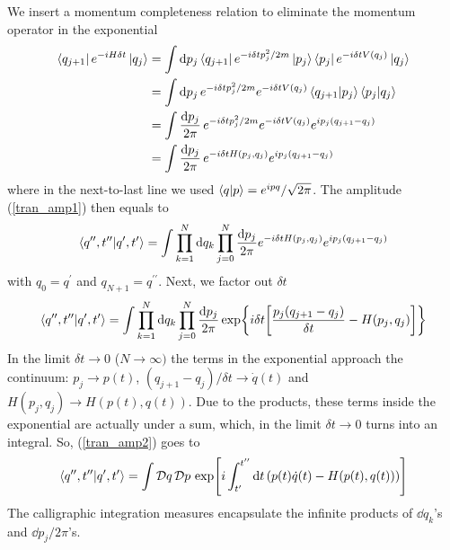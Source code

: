 We insert a momentum completeness relation to eliminate the momentum operator in the exponential
\begin{equation}
\begin{aligned}
   \bra{q_{j+1}}e^{-iH\delta t}\ket{q_j}&=\int\dd p_j\bra{q_{j+1}}e^{-i\delta tp_j^2/2m}\ket{p_j}\bra{p_j}e^{-i\delta t V(q_j)}\ket{q_j}\\
   &=\int\dd p_j\,e^{-i\delta t p_j^2/2m}e^{-i\delta tV(q_j)}\braket{q_{j+1}}{p_{j}}\braket{p_j}{q_j}\\
   &=\int\frac{\dd p_j}{2\pi}\,e^{-i\delta tp_j^2/2m}e^{-i\delta tV(q_j)}e^{ip_j(q_{j+1}-q_j)}\\
   &=\int\frac{\dd p_j}{2\pi}\,e^{-i\delta tH(p_j,q_j)}e^{ip_j(q_{j+1}-q_j)}
   \label{intermediate}
\end{aligned}
\end{equation}
where in the next-to-last line we used $\braket{q}{p}=e^{ipq}/\sqrt{2\pi}$.
The amplitude (\ref{tran_amp1}) then equals to
\begin{equation}
    \braket{q^{\prime\prime},t^{\prime\prime}}{q^{\prime},t^{\prime}}=\int\prod_{k=1}^{N}\dd q_k\prod_{j=0}^N\frac{\dd p_j}{2\pi}e^{-i\delta tH(p_j,q_j)}e^{ip_j(q_{j+1}- q_j)}
    \label{tran_amp_products}
\end{equation}
with $q_0=q^\prime$ and $q_{N+1}=q^{\prime\prime}$. Next, we factor out $\delta t$
\begin{equation}
    \braket{q^{\prime\prime},t^{\prime\prime}}{q^{\prime},t^{\prime}}=\int\prod_{k=1}^{N}\dd q_k\prod_{j=0}^N\frac{\dd p_j}{2\pi}\exp{i\delta t\qty[\frac{p_j(q_{j+1}- q_j)}{\delta t}-H(p_j,q_j)]}
    \label{tran_amp2}
\end{equation}
In the limit $\delta t\to0$ ($N\to\infty)$ the terms in the exponential approach the continuum: $p_j\to p(t)$, $(q_{j+1}-q_j)/\delta t\to\dot{q}(t)$ and $H(p_j,q_j)\to H(p(t),q(t))$. Due to the products, these terms inside the exponential are actually under a sum, which, in the limit $\delta t\to0$ turns into an integral. So, (\ref{tran_amp2}) goes to
\begin{equation}
    \braket{q^{\prime\prime},t^{\prime\prime}}{q^{\prime},t^{\prime}}=\int\mathcal{D}q\,\mathcal{D}p\, \exp[i\int_{t^\prime}^{t^{\prime\prime}}\dd t\,\qty(p(t)\dot{q}(t)-H(p(t),q(t)))]
    \label{path_integral_hamilt}
\end{equation}
The calligraphic integration measures encapsulate the infinite products of $\dd q_k$'s and $\dd p_j/2\pi$'s.\\

